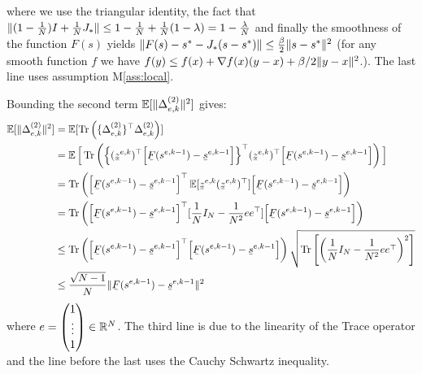 where we use the triangular identity, the fact that $\lVert(1 - \frac{1}{N})I + \frac{1}{N} J_*\rVert \leq 1 - \frac{1}{N} + \frac{1}{N}(1-\lambda) = 1 - \frac{\lambda}{N}$ and finally the smoothness of the function $F(s)$ yields $\lVert F(s) - s^* - J_* (s - s^*)\rVert \leq \frac{\beta}{2}\lVert s - s^*\rVert^2$ (for any smooth function $f$ we have $f(y) \leq f(x) + \nabla f(x) (y-x) + \beta/2 \lVert y-x\rVert^2$.). The last line uses assumption M\ref{ass:local}.

Bounding the second term $\operatorname*{\mathbb{E}}[\lVert\Delta_{e,k}^{(2)}\rVert^2] $ gives:
\begin{equation}
\begin{split}
\E[\norm{\Delta_{e,k}^{(2)}}^2]  & = \E[\operatorname{Tr}\left(\{\Delta_{e,k}^{(2)}\}^\top\Delta_{e,k}^{(2)}\right)]  \\
& =  \E \Big[\operatorname{Tr}\left(\Big\{ (\barbelow{z}^{e,k})^\top \Big[ \barbelow{F}(s^{e,k-1}) - \barbelow{s}^{e,k-1} \Big] \Big\}^\top (\barbelow{z}^{e,k})^\top \Big[ \barbelow{F}(s^{e,k-1}) - \barbelow{s}^{e,k-1} \Big] \right) \Big] \\
& = \operatorname{Tr}\left(\Big[ \barbelow{F}(s^{e,k-1}) - \barbelow{s}^{e,k-1} \Big]^\top \E[\barbelow{z}^{e,k} (\barbelow{z}^{e,k})^\top ]  \Big[ \barbelow{F}(s^{e,k-1}) - \barbelow{s}^{e,k-1} \Big]\right) \\
& = \operatorname{Tr}\left(\Big[ \barbelow{F}(s^{e,k-1}) - \barbelow{s}^{e,k-1} \Big]^\top [\frac{1}{N} I_{N} - \frac{1}{N^2} ee^\top]  \Big[ \barbelow{F}(s^{e,k-1}) - \barbelow{s}^{e,k-1} \Big]\right) \\
& \leq\operatorname{Tr}\left(\Big[ \barbelow{F}(s^{e,k-1}) - \barbelow{s}^{e,k-1} \Big]^\top\Big[ \barbelow{F}(s^{e,k-1}) - \barbelow{s}^{e,k-1} \Big]\right) \sqrt{\operatorname{Tr} \left[\left( \frac{1}{N} I_{N} - \frac{1}{N^2} ee^\top  \right)^2\right]} \\
& \leq  \frac{\sqrt{N-1}}{N} \norm{ \barbelow{F}(s^{e,k-1}) - \barbelow{s}^{e,k-1}}^2 \\
\end{split}
\end{equation}
where $e = \begin{pmatrix} 
1  \\
\vdots  \\
1
\end{pmatrix} \in \mathbb{R}^{N}$. The third line is due to the linearity of the Trace operator and the line before the last uses the Cauchy Schwartz inequality.

